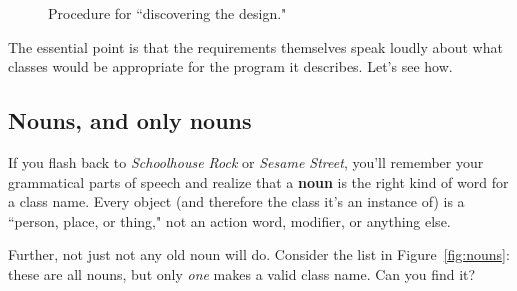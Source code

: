 \setlength{\fboxsep}{10pt}
\begin{figure}
\centering
{}
\vspace{.1in}
\caption{Procedure for ``discovering the design."}
\label{fig:discovering}
\end{figure}

The essential point is that the requirements themselves speak loudly about
what classes would be appropriate for the program it describes. Let's see how.

\subsection{Nouns, and only nouns}

If you flash back to \textit{Schoolhouse Rock} or \textit{Sesame Street},
you'll remember your grammatical parts of speech and realize that a
\textbf{noun} is the right kind of word for a class name. Every object (and
therefore the class it's an instance of) is a ``person, place, or thing," not
an action word, modifier, or anything else.

Further, not just not any old noun will do. Consider the list in
Figure~\ref{fig:nouns}: these are all nouns, but only \textit{one} makes a
valid class name. Can you find it?

